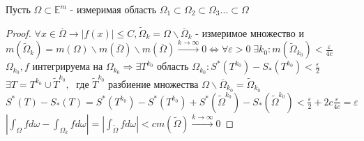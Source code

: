 \documentclass{letnab}
\begin{document}
\begin{theorem}
	Пусть $\Omega\subset \mathbb{E}^m$ - измеримая область $\Omega_1 \subset  \Omega_2 \subset  \Omega_3 \dots \subset \Omega$ 
\end{theorem}
\begin{proof}
	$\forall x\in \overline{\Omega} \rightarrow |f(x)|\leq C, \widetilde{\Omega}_k=\Omega\backslash \overline{\Omega}_k  $ - измеримое множество и $m(\widetilde{\Omega}_k)=m(\Omega)\backslash m(\overline{\Omega})\backslash m(\overline{\Omega})\xrightarrow{k\rightarrow \infty} 0  \Leftrightarrow  \forall \varepsilon>0 \; \exists k_0: m(\widetilde{\Omega}_{k_0})< \frac{\varepsilon}{4c}$ \\
	$\Omega_{k_0}, f $ интегрируема на $\Omega_{k_0} \Rightarrow \exists T^{k_0} $ область $\Omega_{k_0}: S^*(T^{k_0}) - S_*(T^{k_0})< \frac \varepsilon 2 $\\
	$\exists T=T^{k_0} \cup \widetilde{T}^{k_0}, \;$ где $\widetilde{T}^{k_0} $ разбиение множества $\Omega\backslash \overline{\Omega}_{k_0} = \widetilde{\Omega}_{k_0} $\\
	$S^*(T)-S_*(T)= S^*(T^{k_0}) -  S^*(T^{k_0}) + S^*(\widetilde{\Omega}^{k_0})- S_*(\widetilde{\Omega}^{k_0})< \frac \varepsilon 2 + 2c\frac{\varepsilon}{4c}= \varepsilon $\\
	$|\int_\Omega fd\omega - \int_{\Omega_k} fd\omega| = |\int_{\widetilde{\Omega}}fd\omega|<cm(\widetilde{\Omega})\xrightarrow{k\rightarrow \infty} 0 $
\end{proof}
\end{document}

